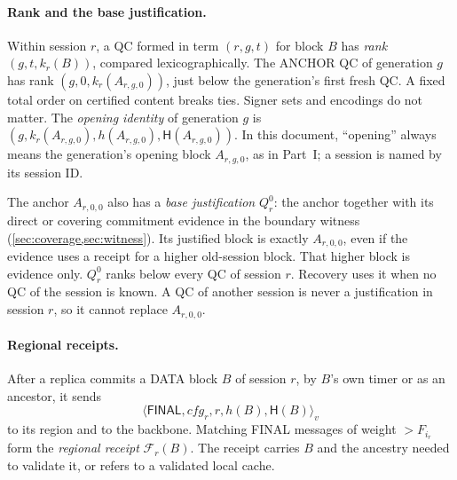 \documentclass[11pt,a4paper]{article}
\newcommand{\FC}{\mathcal F}
\newcommand{\Hash}{\mathsf H}
\newcommand{\tagg}[1]{\ensuremath{\mathsf{#1}}}
\newcommand{\defterm}[1]{\textcolor{rrBlue}{\textit{#1}}}
\begin{document}
\paragraph{Rank and the base justification.}
Within session $r$, a QC formed in term $(r,g,t)$ for block $B$ has \defterm{rank}
$(g,t,k_r(B))$, compared lexicographically. The ANCHOR QC of generation
$g$ has rank $(g,0,k_r(A_{r,g,0}))$, just below the generation's first
fresh QC. A fixed total order on certified content breaks ties. Signer
sets and encodings do not matter. The \defterm{opening
identity} of generation $g$ is
$(g,k_r(A_{r,g,0}),h(A_{r,g,0}),\Hash(A_{r,g,0}))$. In this document,
``opening'' always means the generation's opening block $A_{r,g,0}$, as
in Part~I; a session is named by its session ID.

The anchor $A_{r,0,0}$ also has a \defterm{base justification} $Q_r^0$: the
anchor together with its direct or covering commitment evidence in the
boundary witness (\cref{sec:coverage,sec:witness}). Its justified block
is exactly $A_{r,0,0}$, even if the evidence uses a receipt for a higher
old-session block. That higher block is evidence only. $Q_r^0$ ranks
below every QC of session $r$.
Recovery uses it when no QC of the session is known. A QC of another
session is never a justification in session $r$, so it cannot replace
$A_{r,0,0}$.

\paragraph{Regional receipts.}
After a replica commits a DATA block $B$ of session $r$, by $B$'s own
timer or as an ancestor, it sends
\[
 \langle\tagg{FINAL},\mathit{cfg}_r,r,h(B),\Hash(B)\rangle_v
\]
to its region and to the backbone. Matching FINAL messages of weight
$>F_{i_r}$ form the \defterm{regional receipt} $\FC_r(B)$. The receipt carries $B$ and the ancestry needed to validate it, or
refers to a validated local cache.
\end{document}
